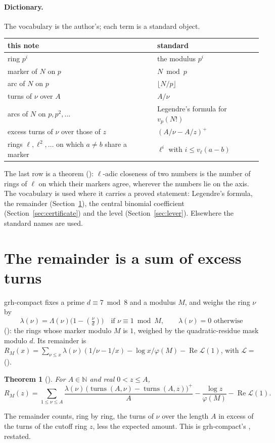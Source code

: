 \documentclass[11pt]{article}
\newtheorem{theorem}{Theorem}[section]
\theoremstyle{definition}
\theoremstyle{remark}
\begin{document}
\paragraph{Dictionary.} The vocabulary is the author's; each term is a standard object.
\begin{center}
\begin{tabular}{ll}
\toprule
this note & standard\\
\midrule
ring $p^i$ & the modulus $p^i$\\
marker of $N$ on $p$ & $N\bmod p$\\
arc of $N$ on $p$ & $\lfloor N/p\rfloor$\\
turns of $\nu$ over $A$ & $A/\nu$\\
arcs of $N$ on $p,p^2,\dots$ & Legendre's formula for $v_p(N!)$\\
excess turns of $\nu$ over those of $z$ & $(A/\nu-A/z)^+$\\
rings $\ell,\ell^2,\dots$ on which $a\ne b$ share a marker & $\ell^i$ with $i\le v_\ell(a-b)$\\
\bottomrule
\end{tabular}
\end{center}
The last row is a theorem (): $\ell$-adic closeness
of two numbers is the number of rings of $\ell$ on which their markers agree, wherever the numbers
lie on the axis. The vocabulary is used where it carries a proved statement: Legendre's formula, the remainder
(Section~\ref{sec:remainder}), the central binomial coefficient (Section~\ref{sec:certificate})
and the level (Section~\ref{sec:lever}). Elsewhere the standard names are used.

\section{The remainder is a sum of excess turns}\label{sec:remainder}

grh-compact fixes a prime $d\equiv7\bmod 8$ and a modulus $M$, and weighs the ring $\nu$ by
\[
\lambda(\nu)=\Lambda(\nu)\bigl(1-(\tfrac{\nu}{d})\bigr)\quad\text{if }\nu\equiv1\bmod M,\qquad
\lambda(\nu)=0\text{ otherwise}
\]
(): the rings whose marker modulo $M$ is $1$, weighed by the quadratic-residue
mask modulo $d$. Its remainder is $R_M(x)=\sum_{\nu\le x}\lambda(\nu)(1/\nu-1/x)-\log x/\varphi(M)
-\operatorname{Re}\mathcal L(1)$, with $\mathcal L=$  ().

\begin{theorem}[]
For $A\in\mathbb N$ and real $0<z\le A$,
\[
R_M(z)=\sum_{1\le\nu\le A}\frac{\lambda(\nu)\,\bigl(\operatorname{turns}(A,\nu)-\operatorname{turns}(A,z)\bigr)^+}{A}
-\frac{\log z}{\varphi(M)}-\operatorname{Re}\mathcal L(1).
\]
\end{theorem}
The remainder counts, ring by ring, the turns of $\nu$ over the length $A$ in excess of the turns
of the cutoff ring $z$, less the expected amount. This is grh-compact's ,
restated.
\end{document}
